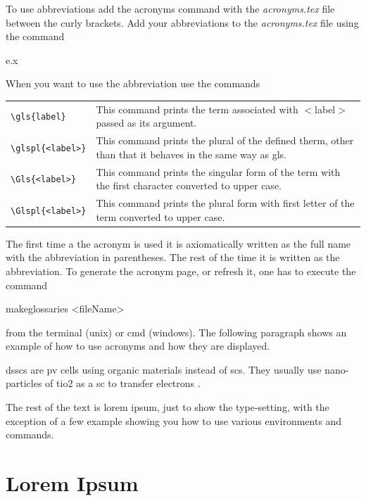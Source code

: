 To use abbreviations add the acronyms command with the \textit{acronyms.tex} file between the curly brackets. Add your abbreviations to the \textit{acronyms.tex} file using the command
\begin{code}
e.x
\end{code}
When you want to use the abbreviation use the commands

\begin{table}[h!]
\center
\begin{tabular}{l p{11cm}}
\verb|\gls{label}| & This command prints the term associated with $<$label$>$ passed as its argument.\\
\verb|\glspl{<label>}| & This command prints the plural of the defined therm, other than that it behaves in the same way as gls.\\
\verb|\Gls{<label>}| & This command prints the singular form of the term with the first character converted to upper case.\\
\verb|\Glspl{<label>}| & This command prints the plural form with first letter of the term converted to upper case.\\
\end{tabular}
\end{table}

The first time a the acronym is used it is axiomatically written as the full name with the abbreviation in parentheses. The rest of the time it is written as the abbreviation. To generate the acronym page, or refresh it, one has to execute the command

\begin{code}
makeglossaries <fileName>
\end{code}

from the terminal (unix) or cmd (windows). The following paragraph shows an example of how to use acronyms and how they are displayed.

\Glspl{dssc} are \gls{pv} cells using organic materials instead of \glspl{sc}. They usually use nano-particles of \gls{tio2} as a \gls{sc} to transfer electrons \cite{Gra91}.

The rest of the text is lorem ipsum, just to show the type-setting, with the exception of a few example showing you how to use various environments and commands.


\chapter{Lorem Ipsum}

